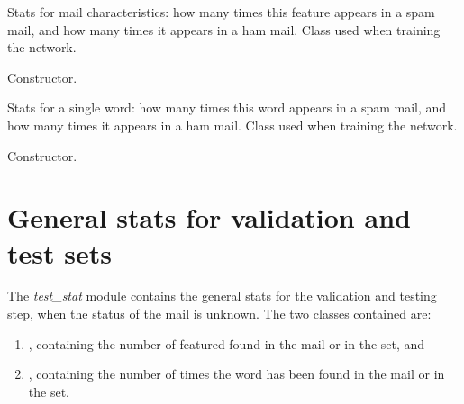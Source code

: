 \documentclass[letterpaper,10pt,english]{sphinxmanual}
\begin{document}
\begin{fulllineitems}
\label{index:gen_stat.Stat}
Stats for mail characteristics: how many times this feature appears in
a spam mail, and how many times it appears in a ham mail. Class used when
training the network.

\begin{fulllineitems}
\label{index:gen_stat.Stat.__init__}
Constructor.

\end{fulllineitems}


\end{fulllineitems}


\begin{fulllineitems}
\label{index:gen_stat.Word}
Stats for a single word: how many times this word appears in a spam
mail, and how many times it appears in a ham mail. Class used when
training the network.

\begin{fulllineitems}
\label{index:gen_stat.Word.__init__}
Constructor.

\end{fulllineitems}


\end{fulllineitems}



\section{General stats for validation and test sets}
\label{index:general-stats-for-validation-and-test-sets}
The \emph{test\_stat} module contains the general stats for the validation and testing step, when the status of the mail is unknown. The two classes contained are:
\begin{enumerate}
\item {} 
, containing the number of featured found in the mail or in the set, and

\item {} 
, containing the number of times the word has been found in the mail or in the set.

\end{enumerate}
\end{document}
